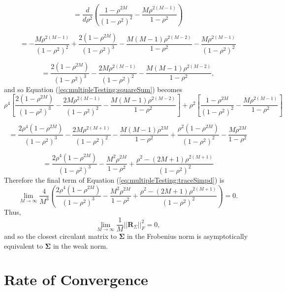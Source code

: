 \documentclass[letterpaper,12pt,oneside,final]{article}
\newcommand{\m}[1]{\mathbf{#1}}               %
\newcommand{\sm}[1]{\boldsymbol{#1}}   %
\newcommand{\norm}[1]{||{#1}||}              %
\newcommand{\frob}[1]{\norm{#1}_F}
\begin{document}
$$= \frac{d}{d\rho^2} \left ( \frac{1 - \rho^{2M}}{(1 - \rho^2)^2} - \frac{M\rho^{2(M-1)}}{1 - \rho^2} \right )$$

$$= -\frac{M\rho^{2(M-1)}}{(1-\rho^2)^2} + \frac{2(1 - \rho^{2M})}{(1 - \rho^2)^3} - \frac{M(M-1)\rho^{2(M-2)}}{1 - \rho^2} - \frac{M\rho^{2(M-1)}}{(1 - \rho^2)^2}$$

$$= \frac{2(1 - \rho^{2M})}{(1 - \rho^2)^3} - \frac{2 M \rho^{2(M-1)}}{(1 - \rho^2)^2} - \frac{M(M-1)\rho^{2(M-2)}}{1 - \rho^2},$$
and so Equation (\ref{eq:multipleTesting:squareSum}) becomes
$$\rho^4 \left [ \frac{2(1 - \rho^{2M})}{(1 - \rho^2)^3} - \frac{2 M \rho^{2(M-1)}}{(1 - \rho^2)^2} - \frac{M(M-1)\rho^{2(M-2)}}{1 - \rho^2} \right ] + \rho^2 \left [ \frac{1 - \rho^{2M}}{(1 - \rho^2)^2} - \frac{M \rho^{2(M-1)}}{1 - \rho^2} \right ]$$

$$= \frac{2\rho^4(1 - \rho^{2M})}{(1 - \rho^2)^3} - \frac{2M \rho^{2(M+1)}}{(1-\rho^2)^2} - \frac{M(M-1)\rho^{2M}}{1 - \rho^2} + \frac{\rho^2(1 - \rho^{2M})}{(1 - \rho^2)^2} - \frac{M \rho^{2M}}{1 - \rho^2}$$

$$=  \frac{2\rho^4(1 - \rho^{2M})}{(1 - \rho^2)^3} - \frac{M^2\rho^{2M}}{1 - \rho^2} + \frac{\rho^2 - (2M + 1)\rho^{2(M+1)}}{(1 - \rho^2)^2}$$
Therefore the final term of Equation (\ref{eq:multipleTesting:traceSimpd}) is
$$\lim_{M \rightarrow \infty} \frac{4}{M^3}  \left ( \frac{2\rho^4(1 - \rho^{2M})}{(1 - \rho^2)^3} - \frac{M^2\rho^{2M}}{1 - \rho^2} + \frac{\rho^2 - (2M + 1)\rho^{2(M+1)}}{(1 - \rho^2)^2} \right ) = 0.$$
Thus,
\begin{equation} \label{eq:multipleTesting:traceEval}
    \lim_{M \rightarrow \infty} \frac{1}{M} \frob{\m{R}_{\Sigma}}^2  = 0,
\end{equation}
and so the closest circulant matrix to $\sm{\Sigma}$ in the Frobenius norm is asymptotically equivalent to $\sm{\Sigma}$ in the weak norm.

\section{Rate of Convergence} \label{c:multipleTesting:rateConverge}
\end{document}
